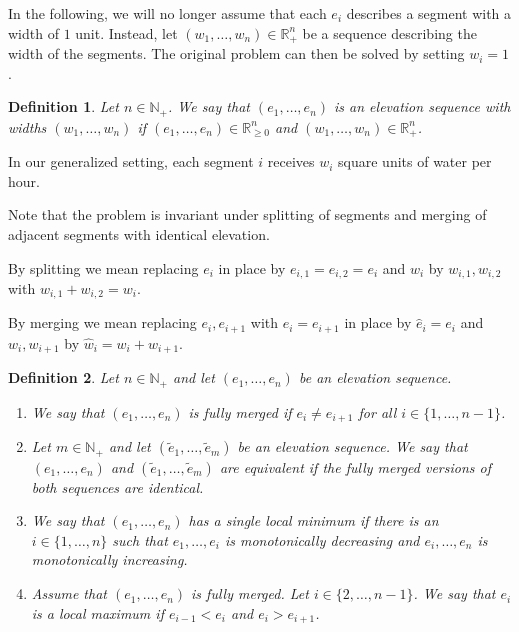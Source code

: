 \documentclass[11pt,a4paper]{article}
\newtheorem{defi}{Definition}
\newcommand{\Np}{\mathbb{N}_+}
\newcommand{\Rp}{\mathbb{R}_+}
\newcommand{\Rnn}{\mathbb{R}_{\ge0}}
\begin{document}
In the following, we will no longer assume that each $e_i$ describes a segment with a width of $1$ unit.
Instead, let $(w_1,\ldots,w_n) \in \Rp^n$ be a sequence describing the width of the segments.
The original problem can then be solved by setting $w_i = 1$.

\begin{defi}
  Let $n\in\Np$.
  We say that $(e_1,\ldots,e_n)$ is an elevation sequence with widths $(w_1,\ldots,w_n)$ if
  $(e_1,\ldots,e_n) \in \Rnn^n$ and $(w_1,\ldots,w_n) \in \Rp^n$.
\end{defi}

In our generalized setting, each segment $i$ receives $w_i$ square units of water per hour.

Note that the problem is invariant under splitting of segments and merging of adjacent segments with identical elevation.

By splitting we mean replacing $e_i$ in place by $e_{i,1} = e_{i,2} = e_i$ and $w_i$ by $w_{i,1}, w_{i,2}$ with $w_{i,1} + w_{i,2} = w_i$.

By merging we mean replacing $e_i, e_{i+1}$ with $e_i = e_{i+1}$ in place by $\hat{e}_i = e_i$ and $w_i, w_{i+1}$ by $\hat{w}_i = w_i + w_{i+1}$.

\begin{defi}
    Let $n\in\Np$ and let $(e_1,\ldots,e_n)$ be an elevation sequence.
    \begin{enumerate}
    \item We say that $(e_1,\ldots,e_n)$ is fully merged if $e_i \ne e_{i+1}$ for all $i\in\{1,\ldots,n - 1\}$.
    \item Let $m\in\Np$ and let $(\tilde{e}_1,\ldots,\tilde{e}_m)$ be an elevation sequence.
        We say that $(e_1,\ldots,e_n)$ and $(\tilde{e}_1,\ldots,\tilde{e}_m)$ are equivalent if the fully merged versions of both sequences are identical.
    \item We say that $(e_1,\ldots,e_n)$ has a single local minimum if there is an
    $i\in\{1,\ldots,n\}$ such that $e_1,\ldots,e_i$ is monotonically decreasing and $e_i,\ldots,e_n$ is monotonically increasing.
    \item Assume that $(e_1,\ldots,e_n)$ is fully merged.
        Let $i\in\{2,\ldots,n-1\}$.
        We say that $e_i$ is a local maximum if $e_{i-1}<e_i$ and $e_i>e_{i+1}$.
    \end{enumerate}
\end{defi}
\end{document}
